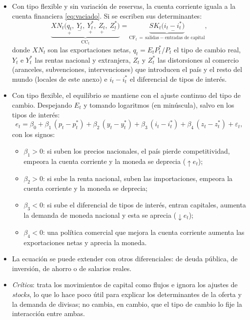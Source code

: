 \documentclass[11pt]{article}
\begin{document}
\begin{itemize}
\item Con tipo flexible y sin variación de reservas, la cuenta corriente iguala a la cuenta financiera \eqref{eq:vaciado}. Si se escriben sus determinantes\nocite{Kallianiotis2013Exchange}:
  \begin{equation}\label{eq:kallianiotis-bp}
  \underbrace{XN_t\big(\underset{+}{q_t},\ \underset{-}{Y_t},\ \underset{+}{Y^{*}_t},\ \underset{+}{Z_t},\ \underset{-}{Z^{*}_t}\big)}_{\mathrm{CC}_t}=\underbrace{SK_t\big(\underset{-}{i_t-i^{*}_t}\big)}_{\mathrm{CF}_t\,=\,\text{salidas}-\text{entradas de capital}},
  \end{equation}
  donde $XN_t$ son las exportaciones netas, $q_t=E_tP^{*}_t/P_t$ el tipo de cambio real, $Y_t$ e $Y^{*}_t$ las rentas nacional y extranjera, $Z_t$ y $Z^{*}_t$ las distorsiones al comercio (aranceles, subvenciones, intervenciones) que introducen el país y el resto del mundo (locales de este anexo) e $i_t-i^{*}_t$ el diferencial de tipos de interés.
\item Con tipo flexible, el equilibrio se mantiene con el ajuste continuo del tipo de cambio. Despejando $E_t$ y tomando logaritmos (en minúscula), salvo en los tipos de interés:
  \begin{equation}\label{eq:kallianiotis-e}
  e_t=\beta_0+\beta_1\,(p_t-p^{*}_t)+\beta_2\,(y_t-y^{*}_t)+\beta_3\,(i_t-i^{*}_t)+\beta_4\,(z_t-z^{*}_t)+\varepsilon_t,
  \end{equation}
  con los signos:
  \begin{itemize}
  \item $\beta_1>0$: si suben los precios nacionales, el país pierde competitividad, empeora la cuenta corriente y la moneda se deprecia ($\uparrow e_t$);
  \item $\beta_2>0$: si sube la renta nacional, suben las importaciones, empeora la cuenta corriente y la moneda se deprecia;
  \item $\beta_3<0$: si sube el diferencial de tipos de interés, entran capitales, aumenta la demanda de moneda nacional y esta se aprecia ($\downarrow e_t$);
  \item $\beta_4<0$: una política comercial que mejora la cuenta corriente aumenta las exportaciones netas y aprecia la moneda.
  \end{itemize}
\item La ecuación se puede extender con otros diferenciales: de deuda pública, de inversión, de ahorro o de salarios reales.
\item \emph{Crítica}: trata los movimientos de capital como flujos e ignora los ajustes de \emph{stocks}, lo que lo hace poco útil para explicar los determinantes de la oferta y la demanda de divisas; no cambia, en cambio, que el tipo de cambio lo fije la interacción entre ambas.
\end{itemize}
\end{document}
